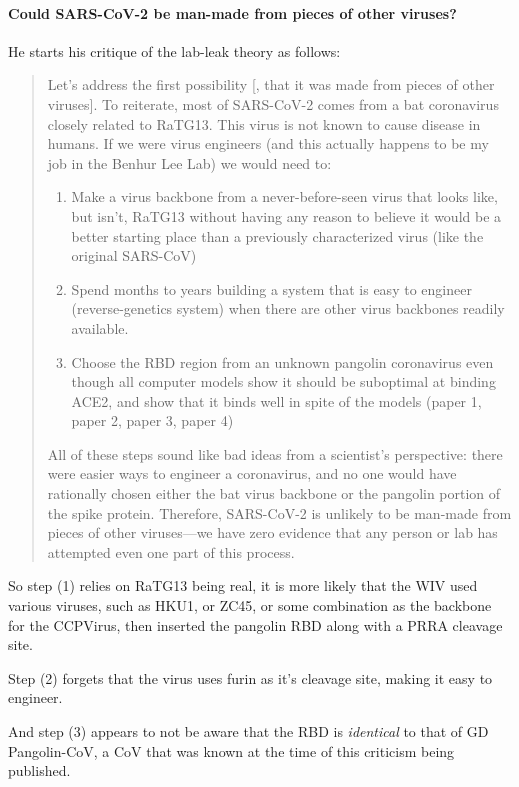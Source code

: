 \documentclass[11pt]{article}
\begin{document}
\paragraph{Could SARS-CoV-2 be man-made from pieces of other viruses?}
\label{sec:orgd5b90f2}
He starts his critique of the lab-leak theory as follows:
\begin{quote}
Let’s address the first possibility [, that it was made from pieces of other viruses]. To reiterate, most of SARS-CoV-2 comes from a bat coronavirus closely related to RaTG13. This virus is not known to cause disease in humans. If we were virus engineers (and this actually happens to be my job in the Benhur Lee Lab) we would need to:

\begin{enumerate}
\item Make a virus backbone from a never-before-seen virus that looks like, but isn’t, RaTG13 without having any reason to believe it would be a better starting place than a previously characterized virus (like the original SARS-CoV)
\item Spend months to years building a system that is easy to engineer (reverse-genetics system) when there are other virus backbones readily available.
\item Choose the RBD region from an unknown pangolin coronavirus even though all computer models show it should be suboptimal at binding ACE2, and show that it binds well in spite of the models (paper 1, paper 2, paper 3, paper 4)
\end{enumerate}

All of these steps sound like bad ideas from a scientist’s perspective: there were easier ways to engineer a coronavirus, and no one would have rationally chosen either the bat virus backbone or the pangolin portion of the spike protein. Therefore, SARS-CoV-2 is unlikely to be man-made from pieces of other viruses—we have zero evidence that any person or lab has attempted even one part of this process.
\end{quote}

So step (1) relies on RaTG13 being real, it is more likely that the WIV used various viruses, such as HKU1, or ZC45, or some combination as the backbone for the CCPVirus, then inserted the pangolin RBD along with a PRRA cleavage site.

Step (2) forgets that the virus uses furin as it's cleavage site, making it easy to engineer.

And step (3) appears to not be aware that the RBD is \emph{identical} to that of GD Pangolin-CoV, a CoV that was known at the time of this criticism being published.
\end{document}

